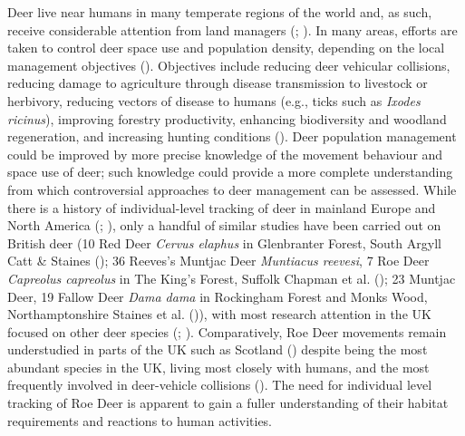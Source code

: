 \documentclass[10pt,a4paper]{article}
\begin{document}
Deer live near humans in many temperate regions of the world and, as such, receive considerable attention from land managers (; ).
In many areas, efforts are taken to control deer space use and population density, depending on the local management objectives ().
Objectives include reducing deer vehicular collisions, reducing damage to agriculture through disease transmission to livestock or herbivory, reducing vectors of disease to humans (e.g., ticks such as \emph{Ixodes ricinus}), improving forestry productivity, enhancing biodiversity and woodland regeneration, and increasing hunting conditions ().
Deer population management could be improved by more precise knowledge of the movement behaviour and space use of deer; such knowledge could provide a more complete understanding from which controversial approaches to deer management can be assessed.
While there is a history of individual-level tracking of deer in mainland Europe and North America (; ), only a handful of similar studies have been carried out on British deer (10 Red Deer \emph{Cervus elaphus} in Glenbranter Forest, South Argyll Catt \& Staines (); 36 Reeves's Muntjac Deer \emph{Muntiacus reevesi}, 7 Roe Deer \emph{Capreolus capreolus} in The King's Forest, Suffolk Chapman et al. (); 23 Muntjac Deer, 19 Fallow Deer \emph{Dama dama} in Rockingham Forest and Monks Wood, Northamptonshire Staines et al. ()), with most research attention in the UK focused on other deer species (; ).
Comparatively, Roe Deer movements remain understudied in parts of the UK such as Scotland () despite being the most abundant species in the UK, living most closely with humans, and the most frequently involved in deer-vehicle collisions ().
The need for individual level tracking of Roe Deer is apparent to gain a fuller understanding of their habitat requirements and reactions to human activities.
\end{document}
